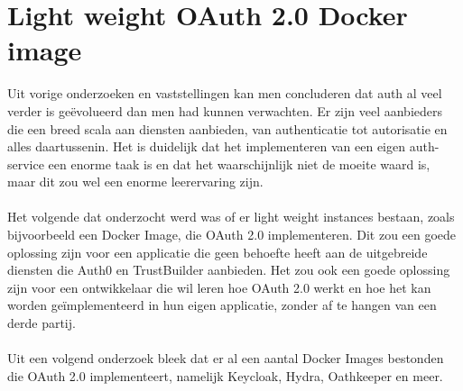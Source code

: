 \section{Light weight OAuth 2.0 Docker image}%
\label{sec:light-weight-oauth-2.0-docker-image}
Uit vorige onderzoeken en vaststellingen kan men concluderen dat auth al veel verder is geëvolueerd dan men had kunnen verwachten. Er zijn veel aanbieders die een breed scala aan diensten aanbieden, van authenticatie tot autorisatie en alles daartussenin. Het is duidelijk dat het implementeren van een eigen auth-service een enorme taak is en dat het waarschijnlijk niet de moeite waard is, maar dit zou wel een enorme leerervaring zijn.
\\
\\
Het volgende dat onderzocht werd was of er light weight instances bestaan, zoals bijvoorbeeld een Docker Image, die OAuth 2.0 implementeren. Dit zou een goede oplossing zijn voor een applicatie die geen behoefte heeft aan de uitgebreide diensten die Auth0 en TrustBuilder aanbieden. Het zou ook een goede oplossing zijn voor een ontwikkelaar die wil leren hoe OAuth 2.0 werkt en hoe het kan worden geïmplementeerd in hun eigen applicatie, zonder af te hangen van een derde partij.
\\
\\
Uit een volgend onderzoek bleek dat er al een aantal Docker Images bestonden die OAuth 2.0 implementeert, namelijk Keycloak, Hydra, Oathkeeper en meer.
